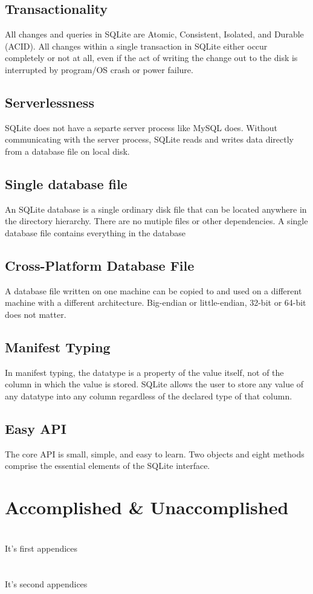 \documentclass[journal]{IEEEtran}
\begin{document}
\subsection{Transactionality}
All changes and queries in SQLite are Atomic, Consistent, Isolated, and Durable (ACID). All changes within a single transaction in SQLite either occur completely or not at all, even if the act of writing the change out to the disk is interrupted by program/OS crash or power failure.

\subsection{Serverlessness}
SQLite does not have a separte server process like MySQL does. Without communicating with the server process, SQLite reads and writes data directly from a database file on local disk.

\subsection{Single database file}
An SQLite database is a single ordinary disk file that can be located anywhere in the directory hierarchy. There are no mutiple files or other dependencies. A single database file contains everything in the database

\subsection{Cross-Platform Database File}
A database file written on one machine can be copied to and used on a different machine with a different architecture. Big-endian or little-endian, 32-bit or 64-bit does not matter.

\subsection{Manifest Typing}
In manifest typing, the datatype is a property of the value itself, not of the column in which the value is stored. SQLite allows the user to store any value of any datatype into any column regardless of the declared type of that column.

\subsection{Easy API}
The core API is small, simple, and easy to learn. Two objects and eight methods comprise the essential elements of the SQLite interface.



\section{Accomplished \& Unaccomplished}




\appendices

\section{}
It's first appendices
        
\section{}
It's second appendices

    
\end{document}
